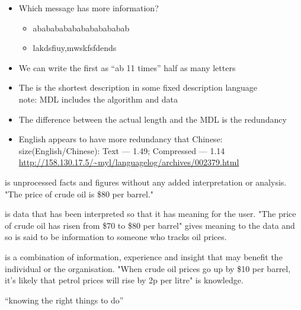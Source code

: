 \documentclass[a4paper,landscape,headrule,footrule,xetex]{foils}
\begin{document}
\begin{itemize}
\item Which message has more information?
  \begin{itemize}
  \item ababababababababababab
  \item lakdsfiuy,mwskfsfdends
  \end{itemize}
\item We can write the first as ``ab 11 times'' half as many letters
\item The  is the shortest description
  in some fixed description language
  \\ note: MDL includes the algorithm and data
\item The difference between the actual length and the MDL is the redundancy
\item English appears to have more redundancy that Chinese:
  \\ size(English/Chinese):  Text --- 1.49; Compressed --- 1.14
\\ \url{http://158.130.17.5/~myl/languagelog/archives/002379.html}
\end{itemize}

\begin{description}
\item {} is unprocessed facts and figures without any added interpretation or analysis. "The price of crude oil is \$80 per barrel."
\item {} is data that has been interpreted so that it has meaning for the user. "The price of crude oil has risen from \$70 to \$80 per barrel" gives meaning to the data and so is said to be information to someone who tracks oil prices.
\item {} is a combination of information, experience and insight that may benefit the individual or the organisation. "When crude oil prices go up by \$10 per barrel, it's likely that petrol prices will rise by 2p per litre" is knowledge.
\item {} ``knowing the right things to do''
\end{description}




\end{document}

